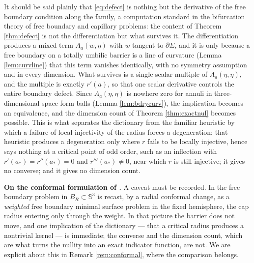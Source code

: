 \documentclass[10pt,a4paper]{amsart}
\newcommand{\Sph}{\mathbb{S}}
\begin{document}
It should be said plainly that \eqref{eq:defect} is nothing but the derivative of the free boundary condition along the family, a computation standard in the bifurcation theory of free boundary and capillary problems: the content of Theorem \ref{thm:defect} is not the differentiation but what survives it. The differentiation produces a mixed term $A_a(w,\eta)$ with $w$ tangent to $\partial\Sigma$, and it is only because a free boundary on a totally umbilic barrier is a line of curvature (Lemma \ref{lem:curvline}) that this term vanishes identically, with no symmetry assumption and in every dimension. What survives is a single scalar multiple of $A_a(\eta,\eta)$, and the multiple is exactly $r'(a)$, so that one scalar derivative controls the entire boundary defect. Since $A_a(\eta,\eta)$ is nowhere zero for annuli in three-dimensional space form balls (Lemma \ref{lem:bdrycurv}), the implication becomes an equivalence, and the dimension count of Theorem \ref{thm:exactnul} becomes possible. This is what separates the dictionary from the familiar heuristic by which a failure of local injectivity of the radius forces a degeneration: that heuristic produces a degeneration only where $r$ fails to be locally injective, hence says nothing at a critical point of odd order, such as an inflection with $r'(a_*)=r''(a_*)=0$ and $r'''(a_*)\neq 0$, near which $r$ is still injective; it gives no converse; and it gives no dimension count.

\medskip
\noindent\textbf{On the conformal formulation of \cite{NZ1}.} A caveat must be recorded. In \cite[\S 2.5]{NZ1} the free boundary problem in $B_R\subset\Sph^3$ is recast, by a radial conformal change, as a \emph{weighted} free boundary minimal surface problem in the fixed hemisphere, the cap radius entering only through the weight. In that picture the barrier does not move, and one implication of the dictionary --- that a critical radius produces a nontrivial kernel --- is immediate; the converse and the dimension count, which are what turns the nullity into an exact indicator function, are not. We are explicit about this in Remark \ref{rem:conformal}, where the comparison belongs.
\end{document}
